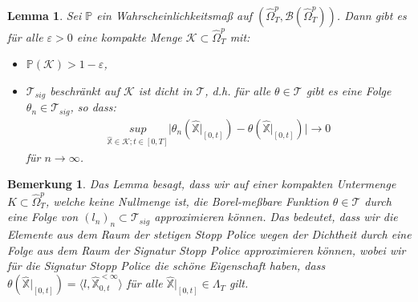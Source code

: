 \documentclass[12pt,titlepage,headsepline]{article}
\newtheorem{lemma}[theorem]{Lemma}
\newtheorem*{bemerkung*}{Bemerkung}
\begin{document}
      \begin{lemma}\label{lemma:dense}
        Sei $\mathbb{P}$ ein Wahrscheinlichkeitsmaß auf $(\hat{\Omega}_T^p,\mathcal{B}(\hat{\Omega}_T^p))$. Dann gibt es für alle $\varepsilon > 0$ eine kompakte Menge $\mathcal{K} \subset \hat{\Omega}_T^p$ mit:
        \begin{itemize}
          \item $\mathbb{P}(\mathcal{K}) > 1 - \varepsilon$,
          \item $\mathcal{T}_{sig}$ beschränkt auf $\mathcal{K}$ ist dicht in $\mathcal{T}$, d.h. für alle $\theta \in \mathcal{T}$ gibt es eine Folge $\theta_n \in \mathcal{T}_{sig}$, so dass:
          \begin{align*}
            \underset{\hat{\mathbb{X}} \in \mathcal{K}; t \in [0,T]}{sup} \lvert \theta_n(\hat{\mathbb{X}}\rvert_{[0,t]}) - \theta(\hat{\mathbb{X}}\rvert_{[0,t]}) \rvert \rightarrow 0
          \end{align*}
          für $n \rightarrow \infty$.
        \end{itemize}
      \end{lemma}
      \begin{bemerkung*}
        \textup{
        Das Lemma besagt, dass wir auf einer kompakten Untermenge $K \subset \hat{\Omega}_T^p $, welche keine Nullmenge ist, die Borel-meßbare Funktion $\theta \in \mathcal{T}$ durch eine Folge von $(l_n)_n \subset \mathcal{T}_{sig}$ approximieren können. Das bedeutet, dass wir die Elemente aus dem Raum der stetigen Stopp Police wegen der Dichtheit durch eine Folge aus dem Raum der Signatur Stopp Police approximieren können, wobei wir für die Signatur Stopp Police die schöne Eigenschaft haben, dass $\theta(\hat{\mathbb{X}}\rvert_{[0,t]})=\langle l, \hat{\mathbb{X}}^{<\infty}_{0,t} \rangle$ für alle
        $\hat{\mathbb{X}}\rvert_{[0,t]} \in \Lambda_T$ gilt.
        }
      \end{bemerkung*}
\end{document}
